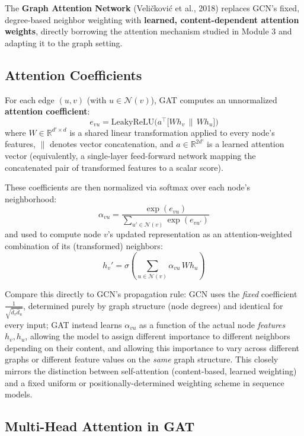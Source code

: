 \documentclass[12pt,a4paper]{article}
\begin{document}
The \textbf{Graph Attention Network} (Veličković et al., 2018) replaces GCN's fixed, degree-based neighbor weighting with \textbf{learned, content-dependent attention weights}, directly borrowing the attention mechanism studied in Module 3 and adapting it to the graph setting.

\subsection{Attention Coefficients}

\begin{defbox}
For each edge $(u,v)$ (with $u \in \mathcal{N}(v)$), GAT computes an unnormalized \textbf{attention coefficient}:
\[
e_{vu} = \text{LeakyReLU}\Big(a^\top \big[W h_v \,\|\, W h_u\big]\Big)
\]
where $W \in \mathbb{R}^{d' \times d}$ is a shared linear transformation applied to every node's features, $\|$ denotes vector concatenation, and $a \in \mathbb{R}^{2d'}$ is a learned attention vector (equivalently, a single-layer feed-forward network mapping the concatenated pair of transformed features to a scalar score).

These coefficients are then normalized via softmax over each node's neighborhood:
\[
\alpha_{vu} = \frac{\exp(e_{vu})}{\sum_{u' \in \mathcal{N}(v)} \exp(e_{vu'})}
\]
and used to compute node $v$'s updated representation as an attention-weighted combination of its (transformed) neighbors:
\[
h_v' = \sigma\left(\sum_{u \in \mathcal{N}(v)} \alpha_{vu}\, W h_u\right)
\]
\end{defbox}

\begin{keyidea}
Compare this directly to GCN's propagation rule: GCN uses the \emph{fixed} coefficient $\frac{1}{\sqrt{\hat{d}_v \hat{d}_u}}$, determined purely by graph structure (node degrees) and identical for every input; GAT instead learns $\alpha_{vu}$ as a function of the actual node \emph{features} $h_v, h_u$, allowing the model to assign different importance to different neighbors depending on their content, and allowing this importance to vary across different graphs or different feature values on the \emph{same} graph structure. This closely mirrors the distinction between self-attention (content-based, learned weighting) and a fixed uniform or positionally-determined weighting scheme in sequence models.
\end{keyidea}

\subsection{Multi-Head Attention in GAT}
\end{document}
